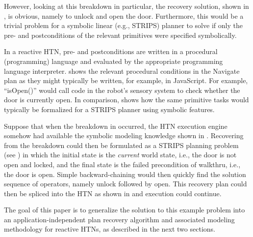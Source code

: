 \documentclass{llncs}
\begin{document}
However, looking at this breakdown in particular, the recovery
solution, shown in , is obvious, namely to unlock and
open the door.  Furthermore, this would be a trivial problem for a
symbolic linear (e.g., STRIPS) planner to solve if only the pre-
and postconditions of the relevant primitives were specified
symbolically.

In a reactive HTN, pre- and postconditions are written in a procedural
(programming) language and evaluated by the appropriate programming
language interpreter.   shows the relevant procedural
conditions in the Navigate plan as they might typically be written,
for example, in JavaScript.  For example, ``isOpen()'' would call code in
the robot's sensory system to check whether the door is currently
open.  In comparison,  shows how the same primitive
tasks would typically be formalized for a STRIPS planner using
symbolic features.

Suppose that when the breakdown in  occurred, the HTN
execution engine somehow had available the symbolic modeling
knowledge shown in .  Recovering from the breakdown
could then be formulated as a STRIPS planning problem (see
) in which the initial state is the \emph{current} world
state, i.e., the door is not open and locked, and the final state is
the failed precondition of walkthru, i.e., the door is open.
Simple backward-chaining would then quickly find the solution sequence of
operators, namely unlock followed by open.  This recovery plan could
then be spliced into the HTN as shown in  and execution
could continue.

The goal of this paper is to generalize the solution to this example
problem into an application-independent plan recovery algorithm and
associated modeling methodology for reactive HTNs, as described in the
next two sections.
\end{document}
